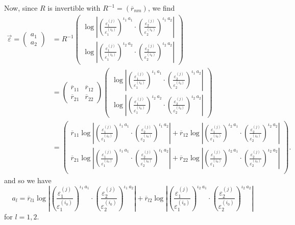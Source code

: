 Now, since $R$ is invertible with $R^{-1} = (\overline{r}_{nm})$, we find
\begin{align*}
\vec{\varepsilon} = \begin{pmatrix} a_1 \\ a_2 \end{pmatrix} 
	& =  R^{-1} \begin{pmatrix} 
		\log\left|\left(\frac{\varepsilon_1^{(j)}}{\varepsilon_1^{(i_0)}}\right)^{\iota_1 \ a_1} \cdot 
		 \left(\frac{\varepsilon_2^{(j)}}{\varepsilon_2^{(i_0)}}\right)^{\iota_1 \ a_2}\right| \\ 
		\log\left|\left(\frac{\varepsilon_1^{(j)}}{\varepsilon_1^{(i_0)}}\right)^{\iota_2\ a_2} \cdot 
		 \left(\frac{\varepsilon_2^{(j)}}{\varepsilon_2^{(i_0)}}\right)^{\iota_2 \ a_2}\right|
		 \end{pmatrix}\\
	& = \begin{pmatrix}
		\overline{r}_{11} & \overline{r}_{12} \\
		\overline{r}_{21} & \overline{r}_{22}
		\end{pmatrix}
		\begin{pmatrix} 
		\log\left|\left(\frac{\varepsilon_1^{(j)}}{\varepsilon_1^{(i_0)}}\right)^{\iota_1 \ a_1} \cdot 
		 \left(\frac{\varepsilon_2^{(j)}}{\varepsilon_2^{(i_0)}}\right)^{\iota_1 \ a_2}\right| \\ 
		\log\left|\left(\frac{\varepsilon_1^{(j)}}{\varepsilon_1^{(i_0)}}\right)^{\iota_2\ a_2} \cdot 
		 \left(\frac{\varepsilon_2^{(j)}}{\varepsilon_2^{(i_0)}}\right)^{\iota_2 \ a_2}\right|
		 \end{pmatrix}\\
	& = \begin{pmatrix} 
		\overline{r}_{11}\log\left|\left(\frac{\varepsilon_1^{(j)}}{\varepsilon_1^{(i_0)}}\right)^{\iota_1 \ a_1} 		\cdot \left(\frac{\varepsilon_2^{(j)}}{\varepsilon_2^{(i_0)}}\right)^{\iota_1 \ a_2}\right| + 
		\overline{r}_{12}\log\left|\left(\frac{\varepsilon_1^{(j)}}{\varepsilon_1^{(i_0)}}\right)^{\iota_2\ a_1}
		\cdot \left(\frac{\varepsilon_2^{(j)}}{\varepsilon_2^{(i_0)}}\right)^{\iota_2 \ a_2}\right| \\
		\overline{r}_{21}\log\left|\left(\frac{\varepsilon_1^{(j)}}{\varepsilon_1^{(i_0)}}\right)^{\iota_1 \ a_1} 		\cdot \left(\frac{\varepsilon_2^{(j)}}{\varepsilon_2^{(i_0)}}\right)^{\iota_1 \ a_2}\right| +
		\overline{r}_{22}\log\left|\left(\frac{\varepsilon_1^{(j)}}{\varepsilon_1^{(i_0)}}\right)^{\iota_2\ a_1}
		\cdot \left(\frac{\varepsilon_2^{(j)}}{\varepsilon_2^{(i_0)}}\right)^{\iota_2 \ a_2}\right| \\
		\end{pmatrix}.
\end{align*}
and so we have
\[a_l = \overline{r}_{l1}\log\left|\left(\frac{\varepsilon_1^{(j)}}{\varepsilon_1^{(i_0)}}\right)^{\iota_1 \ a_1} 		\cdot \left(\frac{\varepsilon_2^{(j)}}{\varepsilon_2^{(i_0)}}\right)^{\iota_1 \ a_2}\right| + 
	\overline{r}_{l2}\log\left|\left(\frac{\varepsilon_1^{(j)}}{\varepsilon_1^{(i_0)}}\right)^{\iota_2\ a_1}
	\cdot \left(\frac{\varepsilon_2^{(j)}}{\varepsilon_2^{(i_0)}}\right)^{\iota_2 \ a_2}\right|\]
for $l = 1,2$. 

